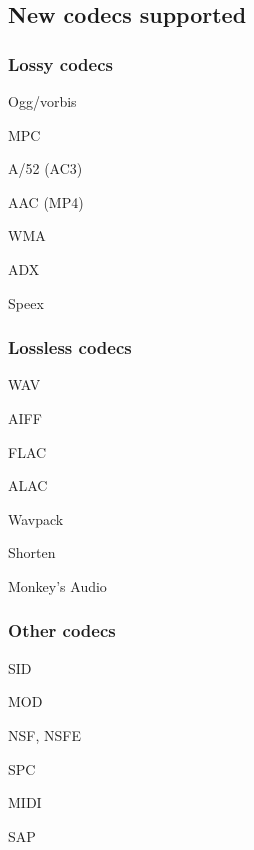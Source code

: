 \subsection{New codecs supported}
\subsubsection{Lossy codecs}
\begin{changelog}
\item Ogg/vorbis
\item MPC
\item A/52 (AC3)
\item AAC (MP4)
\item WMA
\item ADX
\item Speex
\end{changelog}

\subsubsection{Lossless codecs}
\begin{changelog}
\item WAV
\item AIFF
\item FLAC
\item ALAC
\item Wavpack
\item Shorten
\item Monkey's Audio
\end{changelog}

\subsubsection{Other codecs}
\begin{changelog}
\item SID
\item MOD
\item NSF, NSFE
\item SPC
\item MIDI
\item SAP
\end{changelog}
